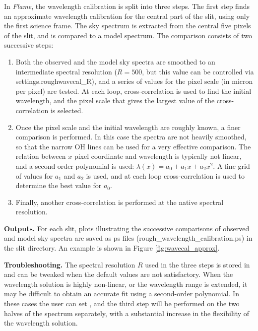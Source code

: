 \documentclass[a4paper]{article}
\newcommand{\flame}{\emph{Flame}}
\begin{document}
\begin{sloppypar}
In \flame, the wavelength calibration is split into three steps. The first step finds an approximate wavelength calibration for the central part of the slit, using only the first science frame. The sky spectrum is extracted from the central five pixels of the slit, and is compared to a model spectrum. The comparison consists of two successive steps:
\begin{enumerate}
\item Both the observed and the model sky spectra are smoothed to an intermediate spectral resolution ($R=500$, but this value can be controlled via settings.roughwavecal\_R), and a series of values for the pixel scale (in micron per pixel) are tested. At each loop, cross-correlation is used to find the initial wavelength, and the pixel scale that gives the largest value of the cross-correlation is selected.
\item Once the pixel scale and the initial wavelength are roughly known, a finer comparison is performed. In this case the spectra are not heavily smoothed, so that the narrow OH lines can be used for a very effective comparison. The relation between $x$ pixel coordinate and wavelength is typically not linear, and a second-order polynomial is used: $\lambda(x) = a_0 + a_1 x + a_2 x^2$. A fine grid of values for $a_1$ and $a_2$ is used, and at each loop cross-correlation is used to determine the best value for $a_0$.
\item Finally, another cross-correlation is performed at the native spectral resolution.
\end{enumerate}

\medskip
\noindent
\textbf{Outputs.} For each slit, plots illustrating the successive comparisons of observed and model sky spectra are saved as ps files (rough\_wavelength\_calibration.ps) in the slit directory. An example is shown in Figure \ref{fig:wavecal_approx}.

\medskip
\noindent
\textbf{Troubleshooting.} The spectral resolution $R$ used in the three steps is stored in  and can be tweaked when the default values are not satisfactory. When the wavelength solution is highly non-linear, or the wavelength range is extended, it may be difficult to obtain an accurate fit using a second-order polynomial. In these cases the user can set , and the third step will be performed on the two halves of the spectrum separately, with a substantial increase in the flexibility of the wavelength solution.


\end{sloppypar}
\end{document}
